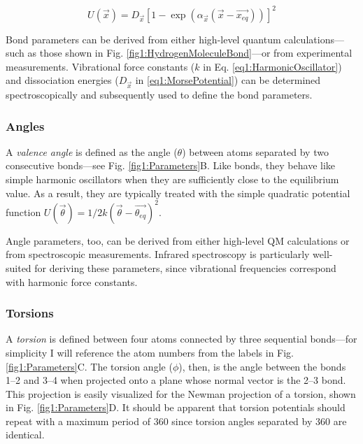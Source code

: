\begin{equation}
   U(\vec{x}) = D_{\vec{x}} \left [ 1 - \exp \left ( \alpha _ {\vec{x}} (
                \vec{x} - \vec{x_{eq}} ) \right ) \right ] ^ 2
   \label{eq1:MorsePotential}
\end{equation}

Bond parameters can be derived from either high-level quantum
calculations---such as those shown in Fig. \ref{fig1:HydrogenMoleculeBond}---or
from experimental measurements. Vibrational force constants ($k$ in Eq.
\ref{eq1:HarmonicOscillator}) and dissociation energies ($D_{\vec{x}}$ in
\ref{eq1:MorsePotential}) can be determined spectroscopically and subsequently
used to define the bond parameters.

\subsubsection{Angles}

A \emph{valence angle} is defined as the angle ($\theta$) between atoms
separated by two consecutive bonds---see Fig. \ref{fig1:Parameters}B. Like
bonds, they behave like simple harmonic oscillators when they are sufficiently
close to the equilibrium value. As a result, they are typically treated with the
simple quadratic potential function $U(\vec{\theta}) = 1/2 k (\vec{\theta} -
\vec{\theta _ {eq}}) ^ 2$.

Angle parameters, too, can be derived from either high-level QM calculations or
from spectroscopic measurements. Infrared spectroscopy is particularly
well-suited for deriving these parameters, since vibrational frequencies
correspond with harmonic force constants.

\subsubsection{Torsions}

A \emph{torsion} is defined between four atoms connected by three sequential
bonds---for simplicity I will reference the atom numbers from the labels in Fig.
\ref{fig1:Parameters}C. The torsion angle ($\phi$), then, is the angle between
the bonds 1--2 and 3--4 when projected onto a plane whose normal vector is the
2--3 bond.  This projection is easily visualized for the Newman projection of a
torsion, shown in Fig. \ref{fig1:Parameters}D. It should be apparent that
torsion potentials should repeat with a maximum period of 360\textdegree{} since
torsion angles separated by 360\textdegree{} are identical.

